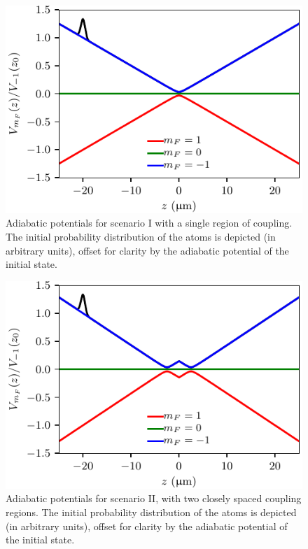 \begin{figure}[h]
    \centerfloat
    \includegraphics{figures/hidden_variables/scenario_1.pdf}
    \caption{Adiabatic potentials for scenario I with a single region of coupling. The initial probability distribution of the atoms is depicted (in arbitrary units), offset for clarity by the adiabatic potential of the initial state.}\label{fig:scenario_1}
\end{figure}
\begin{figure}[h]
    \centerfloat
    \includegraphics{figures/hidden_variables/scenario_2.pdf}
    \caption{Adiabatic potentials for scenario II, with two closely spaced coupling regions. The initial probability distribution of the atoms is depicted (in arbitrary units), offset for clarity by the adiabatic potential of the initial state.}\label{fig:scenario_2}
\end{figure}
